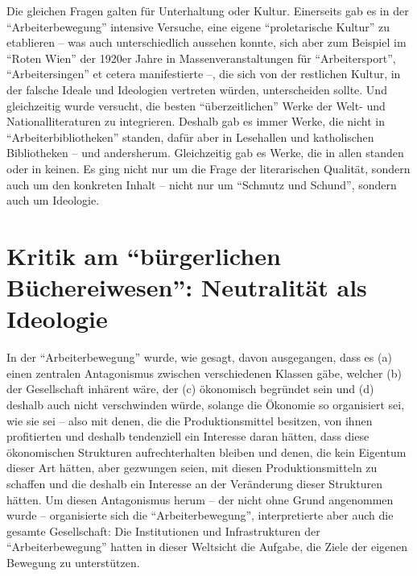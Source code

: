 \documentclass[a4paper,
fontsize=11pt,
oneside,
numbers=noperiodatend,
parskip=half-,
bibliography=totoc,
final
]{scrartcl}
\begin{document}
Die gleichen Fragen galten für Unterhaltung oder Kultur. Einerseits gab
es in der \enquote{Arbeiterbewegung} intensive Versuche, eine eigene
\enquote{proletarische Kultur} zu etablieren -- was auch unterschiedlich
aussehen konnte, sich aber zum Beispiel im \enquote{Roten Wien} der
1920er Jahre in Massenveranstaltungen für \enquote{Arbeitersport},
\enquote{Arbeitersingen} et cetera manifestierte --, die sich von der
restlichen Kultur, in der falsche Ideale und Ideologien vertreten
würden, unterscheiden sollte. Und gleichzeitig wurde versucht, die
besten \enquote{überzeitlichen} Werke der Welt- und Nationalliteraturen
zu integrieren. Deshalb gab es immer Werke, die nicht in
\enquote{Arbeiterbibliotheken} standen, dafür aber in Lesehallen und
katholischen Bibliotheken -- und andersherum. Gleichzeitig gab es Werke,
die in allen standen oder in keinen. Es ging nicht nur um die Frage der
literarischen Qualität, sondern auch um den konkreten Inhalt -- nicht
nur um \enquote{Schmutz und Schund}, sondern auch um Ideologie.

\hypertarget{kritik-am-buxfcrgerlichen-buxfcchereiwesen-neutralituxe4t-als-ideologie}{%
\section{\texorpdfstring{Kritik am \enquote{bürgerlichen
Büchereiwesen}: Neutralität als
Ideologie}{Kritik am \enquote{bürgerlichen Büchereiwesen}: Neutralität als Ideologie}}\label{kritik-am-buxfcrgerlichen-buxfcchereiwesen-neutralituxe4t-als-ideologie}}

In der \enquote{Arbeiterbewegung} wurde, wie gesagt, davon ausgegangen,
dass es (a) einen zentralen Antagonismus zwischen verschiedenen Klassen
gäbe, welcher (b) der Gesellschaft inhärent wäre, der (c) ökonomisch
begründet sein und (d) deshalb auch nicht verschwinden würde, solange
die Ökonomie so organisiert sei, wie sie sei -- also mit denen, die die
Produktionsmittel besitzen, von ihnen profitierten und deshalb
tendenziell ein Interesse daran hätten, dass diese ökonomischen
Strukturen aufrechterhalten bleiben und denen, die kein Eigentum dieser
Art hätten, aber gezwungen seien, mit diesen Produktionsmitteln zu
schaffen und die deshalb ein Interesse an der Veränderung dieser
Strukturen hätten. Um diesen Antagonismus herum -- der nicht ohne Grund
angenommen wurde -- organisierte sich die \enquote{Arbeiterbewegung},
interpretierte aber auch die gesamte Gesellschaft: Die Institutionen und
Infrastrukturen der \enquote{Arbeiterbewegung} hatten in dieser
Weltsicht die Aufgabe, die Ziele der eigenen Bewegung zu unterstützen.
\end{document}
